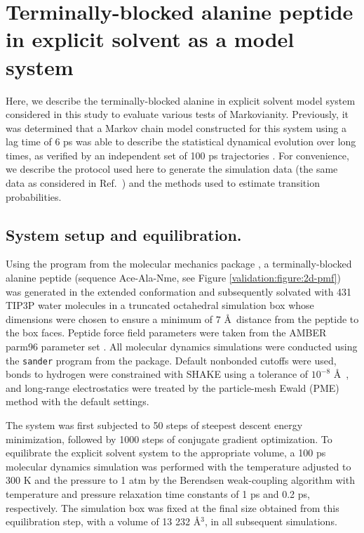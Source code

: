 \section{Terminally-blocked alanine peptide in explicit solvent as a model system}
\label{validation:section:application-to-alanine-dipeptide}

Here, we describe the terminally-blocked alanine in explicit solvent model system considered in this study to evaluate various tests of Markovianity.
Previously, it was determined that a Markov chain model constructed for this system using a lag time of 6 ps was able to describe the statistical dynamical evolution over long times, as verified by an independent set of 100 ps trajectories \cite{chodera:mms:2006}.
For convenience, we describe the protocol used here to generate the simulation data (the same data as considered in Ref.\ \cite{chodera:mms:2006}) and the methods used to estimate transition probabilities.

\subsection{System setup and equilibration.}
\label{validation:section:system-setup-and-equilibration}

Using the  program from the  molecular mechanics package \cite{AMBER7}, a terminally-blocked alanine peptide (sequence Ace-Ala-Nme, see Figure \ref{validation:figure:2d-pmf}) was generated in the extended conformation and subsequently solvated with 431 TIP3P water molecules \cite{jorgensen:1983a} in a truncated octahedral simulation box whose dimensions were chosen to ensure a minimum of $7$ \AA\ distance from the peptide to the box faces.  
Peptide force field parameters were taken from the AMBER parm96 parameter set \cite{AMBER-parm96}.  
All molecular dynamics simulations were conducted using the {\tt sander} program from the  package.  
Default nonbonded cutoffs were used, bonds to hydrogen were constrained with SHAKE using a tolerance of $10^{-8}$ \AA\ \cite{SHAKE}, and long-range electrostatics were treated by the particle-mesh Ewald (PME) method \cite{darden:1993a} with the default settings.

The system was first subjected to 50 steps of steepest descent energy minimization, followed by 1000 steps of conjugate gradient optimization.
To equilibrate the explicit solvent system to the appropriate volume, a 100 ps molecular dynamics simulation was performed with the temperature adjusted to 300 K and the pressure to 1 atm by the Berendsen weak-coupling algorithm \cite{berendsen:1984a} with temperature and pressure relaxation time constants of 1 ps and 0.2 ps, respectively.
The simulation box was fixed at the final size obtained from this equilibration step, with a volume of 13 232 \AA$^3$, in all subsequent simulations.

